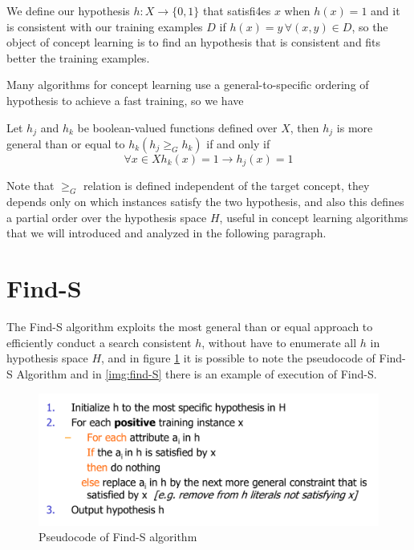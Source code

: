 We define our hypothesis $h: X \to \{0, 1\}$ that satisfi4es $x$ when $h(x) = 1$ and it is consistent with our training examples $D$ if $h(x) = y \, \forall (x, y) \in D$,
so the object of concept learning is to find an hypothesis that is consistent and fits better the training examples.

Many algorithms for concept learning use a general-to-specific ordering of hypothesis to achieve a fast training, so we have
\begin{defi}
	Let $h_j$ and $h_k$ be boolean-valued functions defined over $X$, then $h_j$ is more general than or equal to $h_k (h_j \geq _G h_k)$ if and only if 
	\[ \forall x \in X h_k(x) = 1 \to h_j(x) = 1 \]
\end{defi}
Note that $\geq _G$ relation is defined independent of the target concept, they depends only on which instances satisfy the two hypothesis, and also 
this defines a partial order over the hypothesis space $H$, useful in concept learning algorithms that we will introduced and analyzed in the following paragraph.

\section{Find-S}
The Find-S algorithm exploits the most general than or equal approach to efficiently conduct a search consistent $h$, without have to enumerate all $h$ in hypothesis space $H$,
and in figure \ref{alg:find-S} it is possible to note the pseudocode of Find-S Algorithm and in \ref{img:find-S} there is an example of execution of Find-S.

\begin{figure}
	\caption{Pseudocode of Find-S algorithm}
	\label{alg:find-S}
	\includegraphics[width=\textwidth]{images/find-S-pseudo}
\end{figure}

